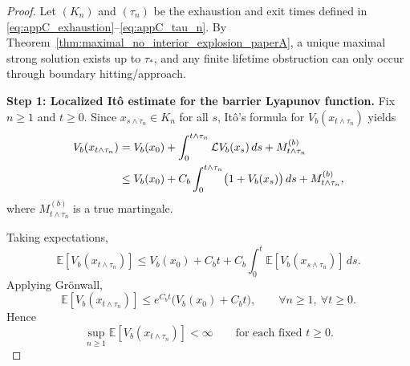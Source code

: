 \documentclass[10pt,a4paper]{amsart}
\begin{document}
\begin{proof}
Let \((K_n)\) and \((\tau_n)\) be the exhaustion and exit times defined in \eqref{eq:appC_exhaustion}--\eqref{eq:appC_tau_n}. By Theorem~\ref{thm:maximal_no_interior_explosion_paperA}, a unique maximal strong solution exists up to \(\tau_*\), and any finite lifetime obstruction can only occur through boundary hitting/approach.

\medskip
\noindent\textbf{Step 1: Localized It\^o estimate for the barrier Lyapunov function.}
Fix \(n\ge1\) and \(t\ge0\). Since \(x_{s\wedge \tau_n}\in K_n\) for all \(s\), It\^o's formula for \(V_b(x_{t\wedge \tau_n})\) yields
\begin{align}
V_b(x_{t\wedge \tau_n})
&=
V_b(x_0)+\int_0^{t\wedge \tau_n}\mathcal LV_b(x_s)\,ds + M_{t\wedge \tau_n}^{(b)} \notag\\
&\le
V_b(x_0)+C_b\int_0^{t\wedge \tau_n}\bigl(1+V_b(x_s)\bigr)\,ds + M_{t\wedge \tau_n}^{(b)},
\label{eq:appC_barrier_ito}
\end{align}
where \(M_{t\wedge \tau_n}^{(b)}\) is a true martingale.

Taking expectations,
\begin{equation}
\label{eq:appC_barrier_expect_pre_gronwall}
\mathbb E[V_b(x_{t\wedge \tau_n})]
\le
V_b(x_0)+C_b t + C_b\int_0^t \mathbb E[V_b(x_{s\wedge \tau_n})]\,ds.
\end{equation}
Applying Gr\"onwall,
\begin{equation}
\label{eq:appC_barrier_expect_bound}
\mathbb E[V_b(x_{t\wedge \tau_n})]
\le e^{C_b t}\bigl(V_b(x_0)+C_b t\bigr),\qquad \forall n\ge1,\ \forall t\ge0.
\end{equation}
Hence
\begin{equation}
\label{eq:appC_barrier_uniform_bound}
\sup_{n\ge1}\mathbb E[V_b(x_{t\wedge \tau_n})]<\infty\qquad \text{for each fixed }t\ge0.
\end{equation}


\end{proof}
\end{document}
